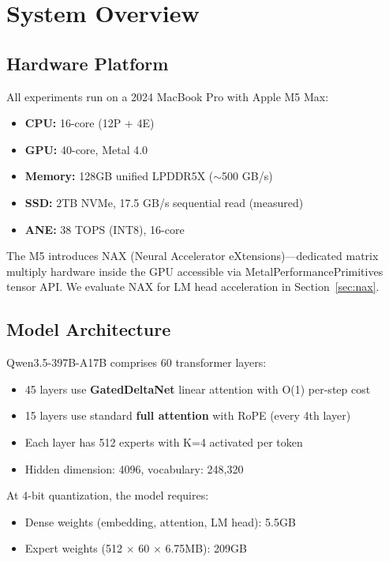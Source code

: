 \documentclass[11pt,twocolumn]{article}
\begin{document}
\section{System Overview}

\subsection{Hardware Platform}

All experiments run on a 2024 MacBook Pro with Apple M5 Max:
\begin{itemize}
    \item \textbf{CPU:} 16-core (12P + 4E)
    \item \textbf{GPU:} 40-core, Metal 4.0
    \item \textbf{Memory:} 128GB unified LPDDR5X ($\sim$500 GB/s)
    \item \textbf{SSD:} 2TB NVMe, 17.5 GB/s sequential read (measured)
    \item \textbf{ANE:} 38 TOPS (INT8), 16-core
\end{itemize}

The M5 introduces NAX (Neural Accelerator eXtensions)---dedicated matrix multiply hardware inside the GPU accessible via MetalPerformancePrimitives tensor API. We evaluate NAX for LM head acceleration in Section~\ref{sec:nax}.

\subsection{Model Architecture}

Qwen3.5-397B-A17B comprises 60 transformer layers:
\begin{itemize}
    \item 45 layers use \textbf{GatedDeltaNet} linear attention with O(1) per-step cost
    \item 15 layers use standard \textbf{full attention} with RoPE (every 4th layer)
    \item Each layer has 512 experts with K=4 activated per token
    \item Hidden dimension: 4096, vocabulary: 248,320
\end{itemize}

At 4-bit quantization, the model requires:
\begin{itemize}
    \item Dense weights (embedding, attention, LM head): 5.5GB
    \item Expert weights (512 $\times$ 60 $\times$ 6.75MB): 209GB
\end{itemize}
\end{document}
